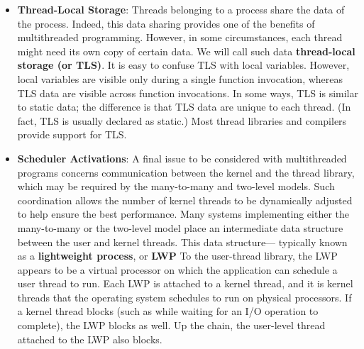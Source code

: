 \documentclass{report}
\begin{document}
\begin{itemize}
            A thread that is to be canceled is often referred to as the \textbf{target thread}. Cancellation of a target thread may occur in two different scenarios:
            \begin{enumerate}
                \item \textbf{Asynchronous cancellation}: One thread immediately terminates the target thread.
                \item \textbf{Deferred cancellation}: The target thread periodically checks whether it should terminate, allo
            \end{enumerate}
        \item \textbf{Thread-Local Storage}: Threads belonging to a process share the data of the process. Indeed, this data sharing provides one of the benefits of multithreaded programming. However, in some circumstances, each thread might need its own copy of certain data. We will call such data \textbf{thread-local storage (or TLS)}.
            \bigbreak \noindent 
            It is easy to confuse TLS with local variables. However, local variables are visible only during a single function invocation, whereas TLS data are visible across function invocations.
            \bigbreak \noindent 
            In some ways, TLS is similar to static data; the difference is that TLS data are unique to each thread. (In fact, TLS is usually declared as static.) Most thread libraries and compilers provide support for TLS.
        \item \textbf{Scheduler Activations}: A final issue to be considered with multithreaded programs concerns communication between the kernel and the thread library, which may be required by the many-to-many and two-level models. Such coordination allows the number of kernel threads to be dynamically adjusted to help ensure the best performance.
            \bigbreak \noindent 
            Many systems implementing either the many-to-many or the two-level model place an intermediate data structure between the user and kernel threads. This data structure— typically known as a \textbf{lightweight process}, or \textbf{LWP}
            \bigbreak \noindent 
            To the user-thread library, the LWP appears to be a virtual processor on which the application can schedule a user thread to run. Each LWP is attached to a kernel thread, and it is kernel threads that the operating system schedules to run on physical processors. If a kernel thread blocks (such as while waiting for an I/O operation to complete), the LWP blocks as well. Up the chain, the user-level thread attached to the LWP also blocks.

    \end{itemize}
\end{document}
